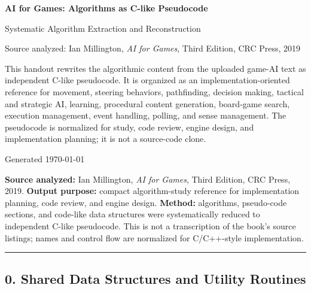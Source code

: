 \documentclass[10pt,letterpaper]{article}
\newcommand{\handouttitle}{AI for Games: Algorithms as C-like Pseudocode}
\begin{document}
\begin{titlepage}
\centering
\vspace*{0.85in}
{\Huge\bfseries\color{HouseBlue}\handouttitle\par}
\vspace{0.22in}
{\Large Systematic Algorithm Extraction and Reconstruction\par}
\vspace{0.34in}
{\large Source analyzed: Ian Millington, \emph{AI for Games}, Third Edition, CRC Press, 2019\par}
\vfill
\begin{minipage}{0.88\textwidth}
\small
This handout rewrites the algorithmic content from the uploaded game-AI text as independent C-like pseudocode. It is organized as an implementation-oriented reference for movement, steering behaviors, pathfinding, decision making, tactical and strategic AI, learning, procedural content generation, board-game search, execution management, event handling, polling, and sense management. The pseudocode is normalized for study, code review, engine design, and implementation planning; it is not a source-code clone.
\end{minipage}
\vfill
{\large Generated \today\par}
\end{titlepage}
\clearpage
{}
\tableofcontents
\clearpage
{}


\textbf{Source analyzed:} Ian Millington, \emph{AI for Games}, Third Edition, CRC Press, 2019.
\textbf{Output purpose:} compact algorithm-study reference for implementation planning, code review, and engine design.
\textbf{Method:} algorithms, pseudo-code sections, and code-like data structures were systematically reduced to independent C-like pseudocode. This is not a transcription of the book's source listings; names and control flow are normalized for C/C++-style implementation.

\medskip\hrule\medskip

\subsection*{0. Shared Data Structures and Utility Routines}
{}
\end{document}
